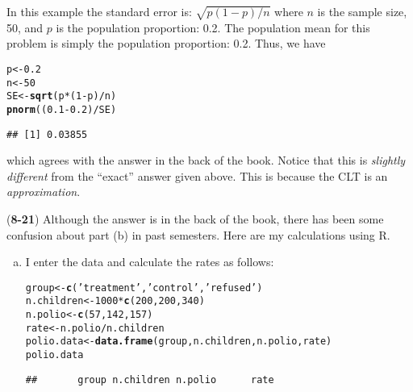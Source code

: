 \documentclass[addpoints,12pt]{exam}\usepackage[]{graphicx}\usepackage[]{color}
\makeatletter
\newcommand{\hlnum}[1]{\textcolor[rgb]{0.686,0.059,0.569}{#1}}%
\newcommand{\hlstr}[1]{\textcolor[rgb]{0.192,0.494,0.8}{#1}}%
\newcommand{\hlopt}[1]{\textcolor[rgb]{0,0,0}{#1}}%
\newcommand{\hlstd}[1]{\textcolor[rgb]{0.345,0.345,0.345}{#1}}%
\newcommand{\hlkwb}[1]{\textcolor[rgb]{0.69,0.353,0.396}{#1}}%
\newcommand{\hlkwd}[1]{\textcolor[rgb]{0.737,0.353,0.396}{\textbf{#1}}}%
\newenvironment{kframe}{%
 \def\at@end@of@kframe{}%
 \ifinner\ifhmode%
  \def\at@end@of@kframe{\end{minipage}}%
  \begin{minipage}{\columnwidth}%
 \fi\fi%
 \def\FrameCommand##1{\hskip\@totalleftmargin \hskip-\fboxsep
 \colorbox{shadecolor}{##1}\hskip-\fboxsep
     \hskip-\linewidth \hskip-\@totalleftmargin \hskip\columnwidth}%
 \MakeFramed {\advance\hsize-\width
   \@totalleftmargin\z@ \linewidth\hsize
   \@setminipage}}%
 {\par\unskip\endMakeFramed%
 \at@end@of@kframe}
\newenvironment{knitrout}{}{} %
\makeatother
\begin{document}
\begin{questions}
\begin{solution}
In this example the standard error is: $\sqrt{p(1-p)/n}$ where $n$ is the sample size, 50, and $p$ is the population proportion: 0.2. The population mean for this problem is simply the population proportion: 0.2. Thus, we have
\begin{knitrout}
\color{fgcolor}\begin{kframe}
\begin{alltt}
\hlstd{p} \hlkwb{<-} \hlnum{0.2}
\hlstd{n} \hlkwb{<-} \hlnum{50}
\hlstd{SE} \hlkwb{<-} \hlkwd{sqrt}\hlstd{(p} \hlopt{*} \hlstd{(}\hlnum{1} \hlopt{-} \hlstd{p)} \hlopt{/} \hlstd{n)}
\hlkwd{pnorm}\hlstd{((}\hlnum{0.1} \hlopt{-} \hlnum{0.2}\hlstd{)}\hlopt{/}\hlstd{SE)}
\end{alltt}
\begin{verbatim}
## [1] 0.03855
\end{verbatim}
\end{kframe}
\end{knitrout}
which agrees with the answer in the back of the book. Notice that this is \emph{slightly different} from the ``exact'' answer given above. This is because the CLT is an \emph{approximation}. 
  \end{solution}
	\item[]
		\begin{solution} (\textbf{8-21}) Although the answer is in the back of the book, there has been some confusion about part (b) in past semesters. Here are my calculations using R. 
  \begin{enumerate}[(a)]
    \item I enter the data and calculate the rates as follows:
\begin{knitrout}
\color{fgcolor}\begin{kframe}
\begin{alltt}
\hlstd{group} \hlkwb{<-} \hlkwd{c}\hlstd{(}\hlstr{'treatment'}\hlstd{,} \hlstr{'control'}\hlstd{,} \hlstr{'refused'}\hlstd{)}
\hlstd{n.children} \hlkwb{<-} \hlnum{1000} \hlopt{*} \hlkwd{c}\hlstd{(}\hlnum{200}\hlstd{,} \hlnum{200}\hlstd{,} \hlnum{340}\hlstd{)}
\hlstd{n.polio} \hlkwb{<-} \hlkwd{c}\hlstd{(}\hlnum{57}\hlstd{,} \hlnum{142}\hlstd{,} \hlnum{157}\hlstd{)}
\hlstd{rate} \hlkwb{<-} \hlstd{n.polio}\hlopt{/}\hlstd{n.children}
\hlstd{polio.data} \hlkwb{<-} \hlkwd{data.frame}\hlstd{(group, n.children, n.polio, rate)}
\hlstd{polio.data}
\end{alltt}
\begin{verbatim}
##       group n.children n.polio      rate

\end{verbatim}
\end{kframe}
\end{knitrout}
\end{enumerate}
\end{solution}
\end{questions}
\end{document}
